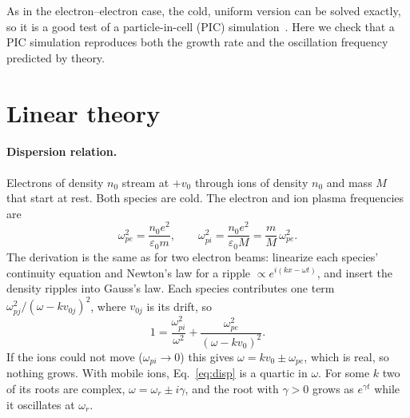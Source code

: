 \documentclass[10pt,twocolumn,letterpaper]{article}
\newcommand{\wpe}{\omega_{pe}}        %
\newcommand{\wpi}{\omega_{pi}}        %
\newcommand{\vz}{v_0}                 %
\begin{document}
As in the electron--electron case, the cold, uniform version can be solved exactly, so it is a
good test of a particle-in-cell (PIC) simulation~\citep{BirdsallLangdon1991}. Here we check that
a PIC simulation reproduces both the growth rate and the oscillation frequency predicted by
theory.

\section{Linear theory}
\label{sec:theory}

\paragraph{Dispersion relation.}
Electrons of density $n_0$ stream at $+\vz$ through ions of density $n_0$ and mass $M$ that start
at rest. Both species are cold. The electron and ion plasma frequencies are
\begin{equation}
  \wpe^2 = \frac{n_0e^2}{\varepsilon_0 m}, \qquad \wpi^2 = \frac{n_0e^2}{\varepsilon_0 M}
  = \frac{m}{M}\,\wpe^2 .
\end{equation}
The derivation is the same as for two electron beams: linearize each species' continuity
equation and Newton's law for a ripple $\propto e^{i(kx-\omega t)}$, and insert the density
ripples into Gauss's law. Each species contributes one term $\omega_{pj}^2/(\omega-kv_{0j})^2$,
where $v_{0j}$ is its drift, so~\citep{Chen2016}
\begin{equation}
  1 = \frac{\wpi^2}{\omega^2} + \frac{\wpe^2}{(\omega - k\vz)^2}.
  \label{eq:disp}
\end{equation}
If the ions could not move ($\wpi\to0$) this gives $\omega = k\vz\pm\wpe$, which is real, so
nothing grows. With mobile ions, Eq.~\eqref{eq:disp} is a quartic in $\omega$. For some $k$ two
of its roots are complex, $\omega=\omega_r\pm i\gamma$, and the root with $\gamma>0$ grows as
$e^{\gamma t}$ while it oscillates at $\omega_r$.
\end{document}
